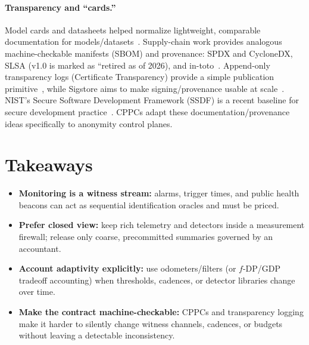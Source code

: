\documentclass[11pt]{article}
\begin{document}
\paragraph{Transparency and ``cards.''}
Model cards and datasheets helped normalize lightweight, comparable documentation for models/datasets~\cite{mitchell2019modelcards,gebru2021datasheets}.
Supply-chain work provides analogous machine-checkable manifests (SBOM) and provenance: SPDX and CycloneDX, SLSA (v1.0 is marked as ``retired as of 2026), and in-toto~\cite{spdx_spec301,slsa_spec_v10,in_toto2019}.
Append-only transparency logs (Certificate Transparency) provide a simple publication primitive~\cite{rfc9162_ct}, while Sigstore aims to make signing/provenance usable at scale~\cite{newman2022sigstore}.
NIST's Secure Software Development Framework (SSDF) is a recent baseline for secure development practice~\cite{nist_ssdf_800_218}.
CPPCs adapt these documentation/provenance ideas specifically to anonymity control planes.




\section{Takeaways}
\begin{itemize}[leftmargin=*]
\item \textbf{Monitoring is a witness stream:} alarms, trigger times, and public health beacons can act as sequential identification oracles and must be priced.
\item \textbf{Prefer closed view:} keep rich telemetry and detectors inside a measurement firewall; release only coarse, precommitted summaries governed by an accountant.
\item \textbf{Account adaptivity explicitly:} use odometers/filters (or $f$-DP/GDP tradeoff accounting) when thresholds, cadences, or detector libraries change over time.
\item \textbf{Make the contract machine-checkable:} CPPCs and transparency logging make it harder to silently change witness channels, cadences, or budgets without leaving a detectable inconsistency.
\end{itemize}
\end{document}
